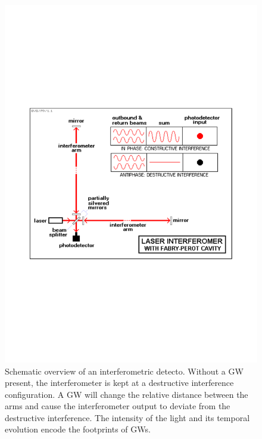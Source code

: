 \documentclass[binding=0.6cm, LaM]{sapthesis}
\begin{document}
\begin{figure}
\includegraphics[scale=0.55]{spot}
\centering
\caption{Schematic overview of an interferometric detecto. Without a GW present, the interferometer is kept at a destructive interference configuration. A GW will change the relative distance between the arms and cause the interferometer output to deviate from the destructive interference. The intensity of the light and its temporal evolution encode the footprints of GWs.}
\label{fig:spot}
\end{figure}
\end{document}
